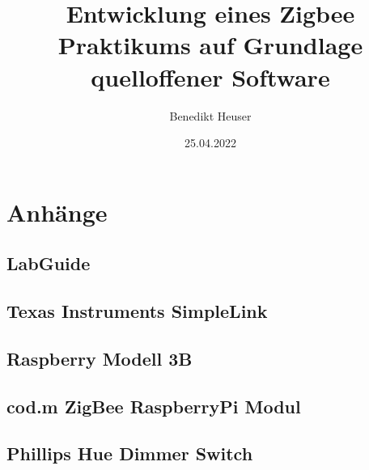 \documentclass[a4paper,11pt,headsepline]{report} %
\title{Entwicklung eines Zigbee Praktikums auf Grundlage quelloffener Software}
\author{Benedikt Heuser}
\date{25.04.2022}
\begin{document}





  
\tableofcontents %


\pagestyle{plain} %
\pagestyle{fancy}









\newpage
\thispagestyle{empty}
\quad %
\newpage






\chapter{Anhänge}
\pagestyle{plain}
\appendix
\section{LabGuide}

\section{Texas Instruments SimpleLink}

\section{Raspberry Modell 3B}

\section{cod.m ZigBee RaspberryPi Modul}

\section{Phillips Hue Dimmer Switch}



\listoffigures
\clearpage

\printbibliography
{}
\end{document}
